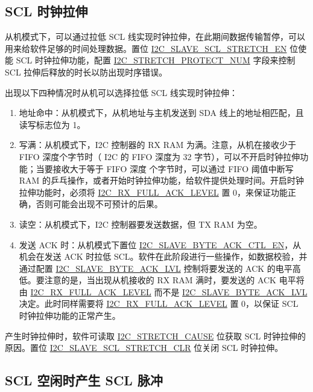 \documentclass[main\_\_CN.tex]{subfiles}
\begin{document}
\subsection{SCL 时钟拉伸}

从机模式下，可以通过拉低 SCL 线实现时钟拉伸，在此期间数据传输暂停，可以用来给软件足够的时间处理数据。置位 \hyperref[fielddesc:I2CSLAVESCLSTRETCHEN]{I2C\_SLAVE\_SCL\_STRETCH\_EN} 位使能 SCL 时钟拉伸功能，配置 \hyperref[fielddesc:I2CSTRETCHPROTECTNUM]{I2C\_STRETCH\_PROTECT\_NUM} 字段来控制 SCL 拉伸后释放的时长以防出现时序错误。

出现以下四种情况时从机可以选择拉低 SCL 线实现时钟拉伸：

\begin{enumerate}
\item 地址命中：从机模式下，从机地址与主机发送到 SDA 线上的地址相匹配，且读写标志位为 1。
\item 写满：从机模式下，I2C 控制器的 RX RAM 为满。注意，从机在接收少于 FIFO 深度个字节时（\chipname{} I2C 的 FIFO 深度为 32 字节），可以不开启时钟拉伸功能；当要接收大于等于 FIFO 深度 个字节时，可以通过 FIFO 阈值中断写 RAM 的乒乓操作，或者开始时钟拉伸功能，给软件提供处理时间。开启时钟拉伸功能时，必须将 \hyperref[fielddesc:I2CRXFULLACKLEVEL]{I2C\_RX\_FULL\_ACK\_LEVEL} 置 0，来保证功能正确，否则可能会出现不可预计的后果。
\item 读空：从机模式下，I2C 控制器要发送数据，但 TX RAM 为空。
\item 发送 ACK 时：从机模式下置位 \hyperref[fielddesc:I2CSLAVEBYTEACKCTLEN]{I2C\_SLAVE\_BYTE\_ACK\_CTL\_EN}，从机会在发送 ACK 时拉低 SCL。软件在此阶段进行一些操作，如数据校验，并通过配置 \hyperref[fielddesc:I2CSLAVEBYTEACKLVL]{I2C\_SLAVE\_BYTE\_ACK\_LVL} 控制将要发送的 ACK 的电平高低。要注意的是，当出现从机接收的 RX RAM 满时，要发送的 ACK 电平将由 \hyperref[fielddesc:I2CRXFULLACKLEVEL]{I2C\_RX\_FULL\_ACK\_LEVEL} 而不是 \hyperref[fielddesc:I2CSLAVEBYTEACKLVL]{I2C\_SLAVE\_BYTE\_ACK\_LVL} 决定。此时同样需要将 \hyperref[fielddesc:I2CRXFULLACKLEVEL]{I2C\_RX\_FULL\_ACK\_LEVEL} 置 0，以保证 SCL 时钟拉伸功能的正常产生。
\end{enumerate}

产生时钟拉伸时，软件可读取 \hyperref[fielddesc:I2CSTRETCHCAUSE]{I2C\_STRETCH\_CAUSE} 位获取 SCL 时钟拉伸的原因。置位 \hyperref[fielddesc:I2CSLAVESCLSTRETCHCLR]{I2C\_SLAVE\_SCL\_STRETCH\_CLR} 位关闭 SCL 时钟拉伸。

\subsection{SCL 空闲时产生 SCL 脉冲}
\end{document}
